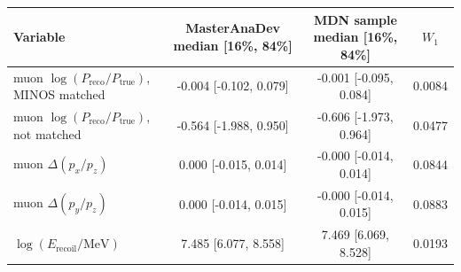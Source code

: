 \begin{tabular}{lccc}
\toprule
Variable & MasterAnaDev median [16\%, 84\%] & MDN sample median [16\%, 84\%] & $W_1$ \\
\midrule
muon $\log(P_\mathrm{reco}/P_\mathrm{true})$, MINOS matched & -0.004 [-0.102, 0.079] & -0.001 [-0.095, 0.084] & 0.0084 \\
muon $\log(P_\mathrm{reco}/P_\mathrm{true})$, not matched & -0.564 [-1.988, 0.950] & -0.606 [-1.973, 0.964] & 0.0477 \\
muon $\Delta(p_x/p_z)$ & 0.000 [-0.015, 0.014] & -0.000 [-0.014, 0.014] & 0.0844 \\
muon $\Delta(p_y/p_z)$ & 0.000 [-0.014, 0.015] & -0.000 [-0.014, 0.015] & 0.0883 \\
$\log(E_\mathrm{recoil}/\mathrm{MeV})$ & 7.485 [6.077, 8.558] & 7.469 [6.069, 8.528] & 0.0193 \\
\bottomrule
\end{tabular}
